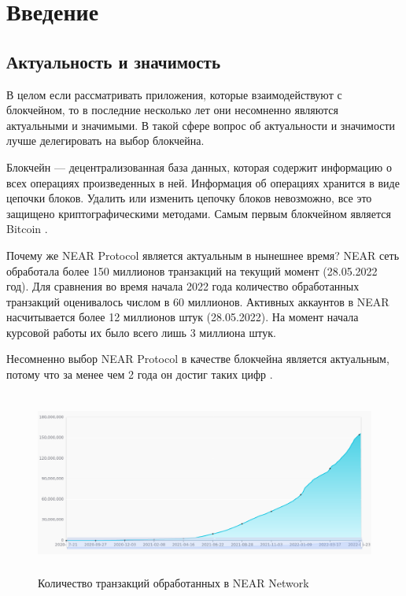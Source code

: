 \section{Введение}
\subsection{Актуальность и значимость}

В целом если рассматривать приложения, которые взаимодействуют с блокчейном, то в последние несколько лет они несомненно являются актуальными и значимыми\cite{DBLP:journals/corr/abs-1712-04649}. В такой сфере вопрос об актуальности и значимости лучше делегировать на выбор блокчейна.

\begin{definition}
    Блокчейн --- децентрализованная база данных, которая содержит информацию о всех операциях произведенных в ней.
    Информация об операциях хранится в виде цепочки блоков.  Удалить или изменить цепочку блоков невозможно, все это защищено криптографическими методами. Самым первым блокчейном является Bitcoin \cite{nakamoto2012bitcoin}.
\end{definition}

Почему же NEAR Protocol является актуальным в нынешнее время? NEAR сеть обработала более 150 миллионов транзакций на текущий момент (28.05.2022 год). Для сравнения во время начала 2022 года количество обработанных транзакций оценивалось числом в 60 миллионов.
Активных аккаунтов в NEAR насчитывается более 12 миллионов штук (28.05.2022). На момент начала курсовой работы их было всего лишь 3 миллиона штук.

Несомненно выбор NEAR Protocol в качестве блокчейна является актуальным, потому что за менее чем 2 года он достиг таких цифр \cite{nearstats}.

\begin{figure}[H]
	\centering
	\includegraphics[height=60mm]{fig/near_1.png}
	\caption{Количество транзакций обработанных в NEAR Network}
\end{figure}


